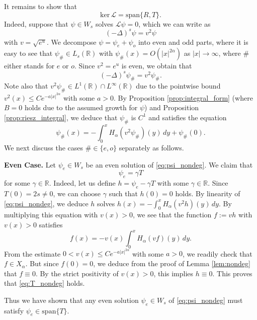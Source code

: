 \documentclass[reqno,10pt,a4paper]{amsart}
\theoremstyle{definition}
\theoremstyle{definition}
\theoremstyle{remark}
\theoremstyle{remark}
\numberwithin{equation}{section}
\newcommand{\R}{\mathbb{R}}
\newcommand{\be}{\begin{equation}}
\newcommand{\ee}{\end{equation}}
\newcommand{\Ds}{(-\Delta)^{s}}
\newcommand{\LL}{\mathcal{L}}
\begin{document}
It remains to show that 
$$
\mathrm{ker} \, \LL = \mathrm{span} \{ R, T \}.
$$
Indeed, suppose that $\psi \in W_s$  solves $\LL \psi = 0$, which we can write as 
$$
\Ds \psi = v^2 \psi
$$
with $v= \sqrt{e^u}$. We decompose $\psi = \psi_e + \psi_o$ into even and odd parts, where it is easy to see that $\psi_{\#} \in L_s(\R)$ with $\psi_{\#}(x) = O(|x|^{2 \alpha})$ as $|x| \to \infty$, where $\#$ either stands for $e$ or $o$. Since $v^2=e^{u}$ is even, we obtain that
$$
\Ds \psi_\# = v^2 \psi_\#.
$$ 
Note also that $v^2 \psi_\# \in L^1(\R) \cap L^\infty(\R)$ due to the pointwise bound $v^2(x) \leq C e^{-a |x|^{2 \alpha}}$ with some $a >0$. By Proposition \ref{prop:integral_form} (where $B=0$ holds due to the assumed growth for $\psi$) and Proposition \ref{prop:riesz_integral}, we deduce that $\psi_\#$ is $C^1$ and satisfies the equation
\be \label{eq:psi_nondeg}
\psi_\#(x) = -\int_0^x H_\alpha(v^2 \psi_\#)(y) \, dy + \psi_\#(0).
\ee 
We next discuss the cases $\# \in \{e, o \}$ separately as follows.

\medskip
\textbf{Even Case.} Let $\psi_e \in W_s$ be an even solution of \eqref{eq:psi_nondeg}. We claim that 
\be \label{eq:T_nondeg}
\psi_e = \gamma T
\ee
for some $\gamma \in \R$. Indeed, let us define $h = \psi_e - \gamma T$ with some $\gamma \in \R$. Since $T(0) = 2s \neq 0$, we can choose $\gamma$ such that $h(0)=0$ holds. By linearity of \eqref{eq:psi_nondeg}, we deduce $h$ solves $h(x) = -\int_0^x H_\alpha(v^2 h)(y) \, dy$. By multiplying this equation with $v(x)>0$, we see that the function $f:= v h$ with $v(x) > 0$ satisfies
$$
f(x) = -v(x) \int_0^x H_\alpha(v f)(y) \, dy.
$$ 
From the estimate $0 < v(x) \leq C e^{-a |x|^{2 \alpha}}$ with some $a > 0$, we readily check that $f \in X_\alpha$. But since $f(0)=0$, we deduce from the proof of Lemma \ref{lem:nondeg} that $f \equiv 0$. By the strict positivity of $v(x) > 0$, this implies $h \equiv 0$. This proves that \eqref{eq:T_nondeg} holds.  

Thus we have shown that any even solution $\psi_e \in W_s$ of \eqref{eq:psi_nondeg} must satisfy $\psi_e \in \mathrm{span} \{ T \}$.
\end{document}
